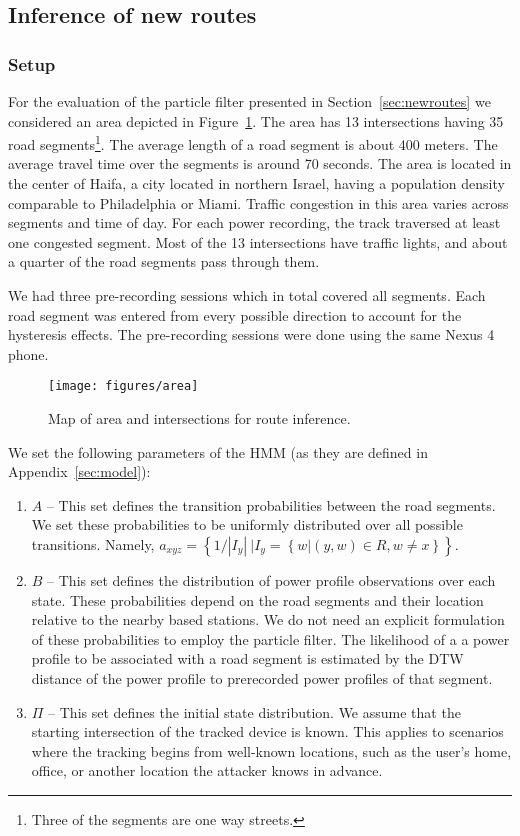 \subsection{Inference of new routes}
\subsubsection{Setup}

For the evaluation of the particle filter presented in Section~\ref{sec:newroutes} we considered an area
 depicted in Figure~\ref{fig:area}. The area has 13 intersections
having 35 road segments\footnote{Three of the segments are one way streets.}. The
average length of a road segment is about 400 meters. The average travel time over the segments is around 70
seconds. The area is located in the center of Haifa, a city located in northern Israel, having a population density comparable to Philadelphia or Miami. 
Traffic congestion in this area varies across segments and time of day.
For each power recording, the track traversed at least one congested segment.
Most of the 13 intersections have traffic lights, and about a quarter of the road segments pass through them.

We had three pre-recording sessions which in total covered all segments. Each road segment was entered from every possible direction to account for the hysteresis effects.
The pre-recording sessions were done using the same Nexus 4 phone.

\begin{figure}
    \centering
    \texttt{[image: figures/area]}
    \caption{Map of area and intersections for route inference.}
    \label{fig:area}
\end{figure}

We set the following  parameters of the HMM (as they are defined in Appendix~\ref{sec:model}):
\begin{enumerate}
    \item $A$ -- This set defines the transition probabilities between the road segments.
    We set these probabilities to be uniformly distributed over all possible transitions.
    Namely, $a_{xyz} = \left\{ 1/|I_y| ~ | I_y = \left\{ w | (y,w)\in R, w \neq x  \right\} \right\}$.
    \item $B$ -- This set defines the distribution of power profile observations over each state.
    These probabilities depend on the road segments and their location relative to the nearby based stations.
    We do not need an explicit formulation of these probabilities to employ the particle filter.
    The likelihood of a a power profile to be associated with a road segment is estimated by the DTW distance of
    the power profile to prerecorded power profiles of that segment.
    \item $\Pi$ -- This set defines the initial state distribution.
    We assume that the starting intersection of the tracked device is known.
    This applies to scenarios where the tracking begins from well-known locations, such as the user's home,
    office, or another location the attacker knows in advance.
\end{enumerate}

